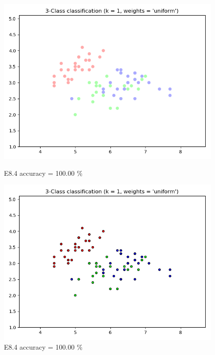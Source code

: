 \documentclass{classrep}
\begin{document}
\begin{figure}[H]
\begin{minipage}{0.5\linewidth}
				\includegraphics[scale=0.25]{KNN_iris_8_7.png}
				\caption{E8.4 accuracy = 100.00 \%}
				\label{E8.4}
			\end{minipage}
			\begin{minipage}{0.5\linewidth}
				\centering
				\includegraphics[scale=0.25]{KNN_iris_8_8.png}
				\caption{E8.4 accuracy = 100.00 \%}
				\label{E8.4}
			\end{minipage}
		\end{figure}
		\FloatBarrier
\end{document}
